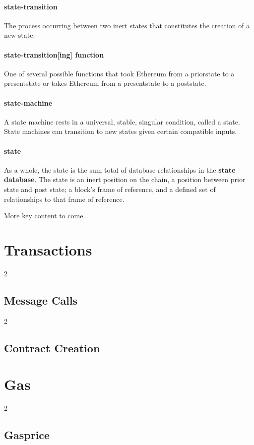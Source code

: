 \documentclass[11pt,a4paper,leqno,bibliography=totoc]{scrartcl}
\newenvironment{alphafootnotes}
    {\par\edef\savedfootnotenumber{\number\value{footnote}}
    \renewcommand{\thefootnote}{\alph{footnote}}
     \setcounter{footnote}{0}}
    {\par\setcounter{footnote}{\savedfootnotenumber}}
\begin{document}
\begin{alphafootnotes}
\begin{multicols}{2}
     \paragraph{state-transition} The process occurring between two inert states that constitutes the creation of a new state.
     \paragraph{state-transition[ing] function} One of several possible functions that took Ethereum from a priorstate to a presentstate or takes Ethereum from a presentstate to a poststate.
    \paragraph{state-machine}A state machine rests in a universal, stable, singular condition, called a state. State machines can transition to new states given certain compatible inputs.
    \paragraph{state}As a whole, the state is the sum total of database relationships in the \textbf{ \gls{state database}}. The state is an inert position on the chain, a position between prior state and post state; a block's frame of reference, and a defined set of relationships to that frame of reference.

    More key content to come...\blindtext

    \clearpage

    \section{Transactions}
{2}
      \subsection{Message Calls}
{2}
      \subsection{Contract Creation}

    \section{Gas}
{2}
    \subsection{Gasprice}


\end{multicols}
\end{alphafootnotes}
\end{document}
